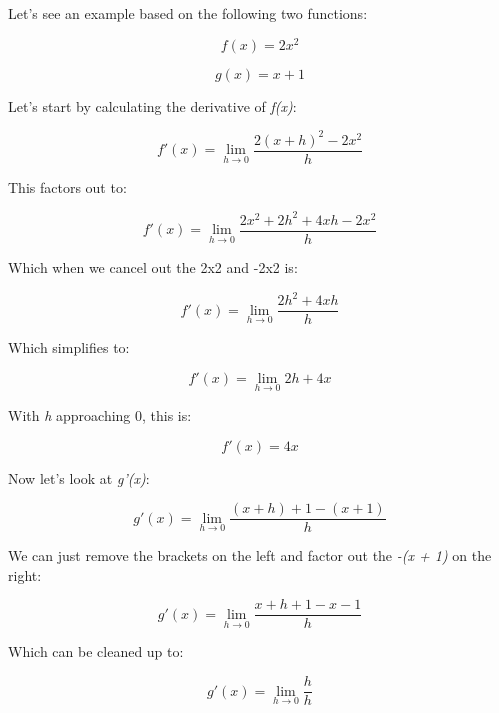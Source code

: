 \documentclass[11pt]{article}
\begin{document}
Let's see an example based on the following two functions:

\begin{equation}f(x) = 2x^{2} \end{equation}

\begin{equation}g(x) = x + 1 \end{equation}

Let's start by calculating the derivative of \emph{f(x)}:

\begin{equation}f'(x) = \lim_{h \to 0} \frac{2(x + h)^{2} - 2x^{2}}{h} \end{equation}

This factors out to:

\begin{equation}f'(x) = \lim_{h \to 0} \frac{2x^{2} + 2h^{2} + 4xh - 2x^{2}}{h} \end{equation}

Which when we cancel out the 2x2 and -2x2 is:

\begin{equation}f'(x) = \lim_{h \to 0} \frac{2h^{2} + 4xh}{h} \end{equation}

Which simplifies to:

\begin{equation}f'(x) = \lim_{h \to 0} 2h + 4x \end{equation}

With \emph{h} approaching 0, this is:

\begin{equation}f'(x) = 4x \end{equation}

Now let's look at \emph{g'(x)}:

\begin{equation}g'(x) = \lim_{h \to 0} \frac{(x + h) + 1 - (x + 1)}{h} \end{equation}

We can just remove the brackets on the left and factor out the \emph{-(x
+ 1)} on the right:

\begin{equation}g'(x) = \lim_{h \to 0} \frac{x + h + 1 - x - 1}{h} \end{equation}

Which can be cleaned up to:

\begin{equation}g'(x) = \lim_{h \to 0} \frac{h}{h} \end{equation}
\end{document}
